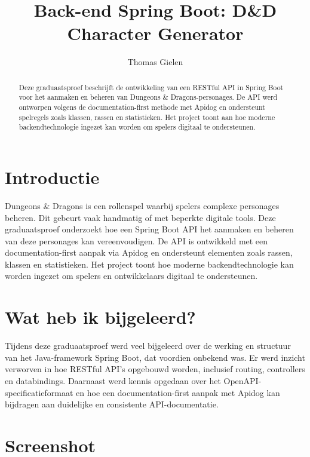 \documentclass[a0,portrait]{hogent-poster}
\title{Back-end Spring Boot: D\&D Character Generator}
\author{Thomas Gielen}
\begin{document}
\maketitle

\begin{abstract}
Deze graduaatsproef beschrijft de ontwikkeling van een RESTful API in Spring Boot voor het aanmaken en beheren van Dungeons \& Dragons-personages. De API werd ontworpen volgens de documentation-first methode met Apidog en ondersteunt spelregels zoals klassen, rassen en statistieken. Het project toont aan hoe moderne backendtechnologie ingezet kan worden om spelers digitaal te ondersteunen.
\end{abstract}

\begin{multicols}{2} %

\section{Introductie}

Dungeons \& Dragons is een rollenspel waarbij spelers complexe personages beheren. Dit gebeurt vaak handmatig of met beperkte digitale tools. Deze graduaatsproef onderzoekt hoe een Spring Boot API het aanmaken en beheren van deze personages kan vereenvoudigen.
De API is ontwikkeld met een documentation-first aanpak via Apidog en ondersteunt elementen zoals rassen, klassen en statistieken. Het project toont hoe moderne backendtechnologie kan worden ingezet om spelers en ontwikkelaars digitaal te ondersteunen.



\section{Wat heb ik bijgeleerd?}

Tijdens deze graduaatsproef werd veel bijgeleerd over de werking en structuur van het Java-framework Spring Boot, dat voordien onbekend was. Er werd inzicht verworven in hoe RESTful API's opgebouwd worden, inclusief routing, controllers en databindings.
Daarnaast werd kennis opgedaan over het OpenAPI-specificatieformaat en hoe een documentation-first aanpak met Apidog kan bijdragen aan duidelijke en consistente API-documentatie.

\section{Screenshot}




\end{multicols}
\end{document}
